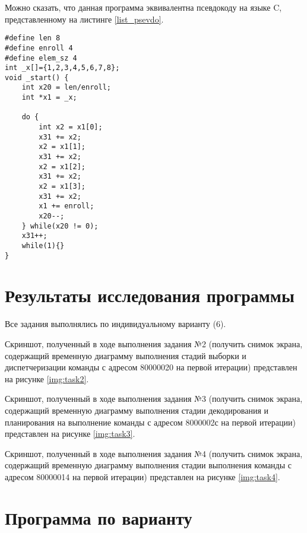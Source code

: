 \clearpage
Можно сказать, что данная программа эквивалентна псевдокоду на языке C, представленному на листинге \ref{list_psevdo}.


\begin{lstlisting}[caption=Псевдокод общей программы,
	label={list_psevdo}]
#define len 8
#define enroll 4
#define elem_sz 4
int _x[]={1,2,3,4,5,6,7,8};
void _start() {
	int x20 = len/enroll;
	int *x1 = _x;
	
	do {
		int x2 = x1[0];
		x31 += x2;
		x2 = x1[1];
		x31 += x2;
		x2 = x1[2];
		x31 += x2;
		x2 = x1[3];
		x31 += x2;
		x1 += enroll;
		x20--;
	} while(x20 != 0);
	x31++;
	while(1){}
}
\end{lstlisting}


\chapter*{Результаты исследования программы}

Все задания выполнялись по индивидуальному варианту (6).

Скриншот, полученный в ходе выполнения задания №2 (получить снимок экрана, содержащий временную диаграмму выполнения стадий выборки и диспетчеризации команды с адресом 80000020 на первой итерации) представлен на рисунке \ref{img:task2}.


\clearpage
Скриншот, полученный в ходе выполнения задания №3 (получить снимок экрана, содержащий временную диаграмму выполнения стадии декодирования и планирования на выполнение команды с адресом 8000002с на первой итерации) представлен на рисунке \ref{img:task3}.


\clearpage
Скриншот, полученный в ходе выполнения задания №4 (получить снимок экрана, содержащий временную диаграмму выполнения стадии выполнения команды с адресом 80000014 на первой итерации) представлен на рисунке \ref{img:task4}.




\chapter*{Программа по варианту}

